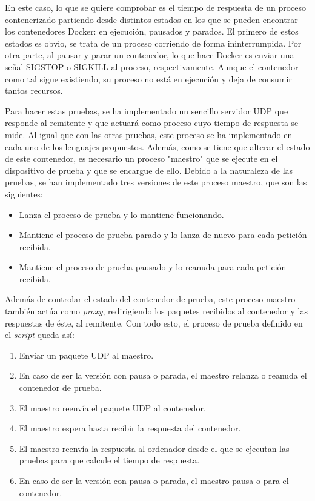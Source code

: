 En este caso, lo que se quiere comprobar es el tiempo de respuesta de un proceso
contenerizado partiendo desde distintos estados en los que se pueden encontrar
los contenedores Docker: en ejecución, pausados y parados. El primero de estos
estados es obvio, se trata de un proceso corriendo de forma ininterrumpida. Por
otra parte, al pausar y parar un contenedor, lo que hace Docker es enviar una
señal SIGSTOP o SIGKILL al proceso, respectivamente. Aunque el contenedor como
tal sigue existiendo, su proceso no está en ejecución y deja de consumir tantos
recursos.

Para hacer estas pruebas, se ha implementado un sencillo servidor UDP que
responde al remitente y que actuará como proceso cuyo tiempo de respuesta se
mide. Al igual que con las otras pruebas, este proceso se ha implementado en
cada uno de los lenguajes propuestos. Además, como se tiene que alterar el
estado de este contenedor, es necesario un proceso "maestro" que se ejecute en
el dispositivo de prueba y que se encargue de ello. Debido a la naturaleza de
las pruebas, se han implementado tres versiones de este proceso maestro, que son
las siguientes:

\begin{itemize}
      \item Lanza el proceso de prueba y lo mantiene funcionando.
      \item Mantiene el proceso de prueba parado y lo lanza de nuevo para cada
            petición recibida.
      \item Mantiene el proceso de prueba pausado y lo reanuda para cada petición
            recibida.
\end{itemize}

Además de controlar el estado del contenedor de prueba, este proceso maestro
también actúa como \textit{proxy}, redirigiendo los paquetes recibidos al
contenedor y las respuestas de éste, al remitente. Con todo esto, el proceso de
prueba definido en el \textit{script} queda así:

\begin{enumerate}
      \item Enviar un paquete UDP al maestro.
      \item En caso de ser la versión con pausa o parada, el maestro relanza o
            reanuda el contenedor de prueba.
      \item El maestro reenvía el paquete UDP al contenedor.
      \item El maestro espera hasta recibir la respuesta del contenedor.
      \item El maestro reenvía la respuesta al ordenador desde el que se ejecutan
            las pruebas para que calcule el tiempo de respuesta.
      \item En caso de ser la versión con pausa o parada, el maestro pausa o para
            el contenedor.
\end{enumerate}

